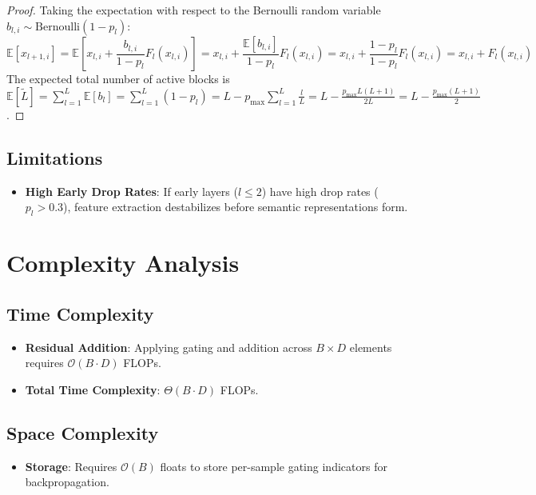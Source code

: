 \documentclass[11pt,a4paper]{article}
\theoremstyle{definition}
\begin{document}
\begin{proof}
Taking the expectation with respect to the Bernoulli random variable $b_{l, i} \sim \text{Bernoulli}(1 - p_l)$:
\begin{equation}
\mathbb{E}[x_{l+1, i}] = \mathbb{E}\left[ x_{l, i} + \frac{b_{l, i}}{1 - p_l} F_l(x_{l, i}) \right] = x_{l, i} + \frac{\mathbb{E}[b_{l, i}]}{1 - p_l} F_l(x_{l, i}) = x_{l, i} + \frac{1 - p_l}{1 - p_l} F_l(x_{l, i}) = x_{l, i} + F_l(x_{l, i})
\end{equation}
The expected total number of active blocks is $\mathbb{E}[\tilde{L}] = \sum_{l=1}^L \mathbb{E}[b_l] = \sum_{l=1}^L (1 - p_l) = L - p_{\text{max}} \sum_{l=1}^L \frac{l}{L} = L - \frac{p_{\text{max}} L(L+1)}{2L} = L - \frac{p_{\text{max}}(L+1)}{2}$.
\end{proof}

\subsection{Limitations}
\begin{itemize}
    \item \textbf{High Early Drop Rates}: If early layers ($l \le 2$) have high drop rates ($p_l > 0.3$), feature extraction destabilizes before semantic representations form.
\end{itemize}

\section{Complexity Analysis}

\subsection{Time Complexity}
\begin{itemize}
    \item \textbf{Residual Addition}: Applying gating and addition across $B \times D$ elements requires $\mathcal{O}(B \cdot D)$ FLOPs.
    \item \textbf{Total Time Complexity}: $\Theta(B \cdot D)$ FLOPs.
\end{itemize}

\subsection{Space Complexity}
\begin{itemize}
    \item \textbf{Storage}: Requires $\mathcal{O}(B)$ floats to store per-sample gating indicators for backpropagation.
\end{itemize}
\end{document}
